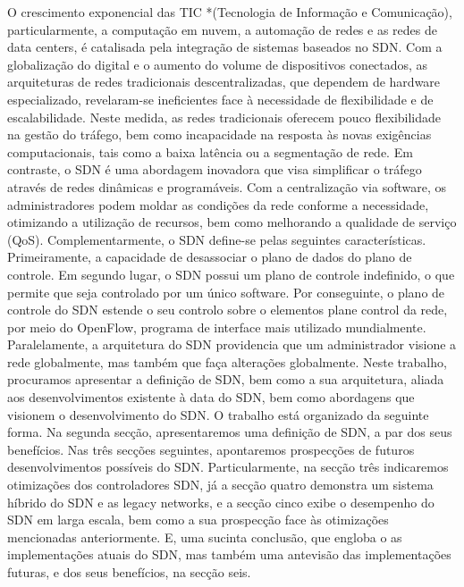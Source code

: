 \documentclass{llncs}
\begin{document}
O crescimento exponencial das TIC *(Tecnologia de Informação e Comunicação), particularmente, a computação em nuvem, a automação de redes e as redes de data centers, é catalisada pela integração de sistemas baseados no SDN. Com a globalização do digital e o aumento do volume de dispositivos conectados, as arquiteturas de redes tradicionais descentralizadas, que dependem de hardware especializado, revelaram-se ineficientes face à necessidade de flexibilidade e de escalabilidade. Neste medida, as redes tradicionais oferecem pouco flexibilidade na gestão do tráfego, bem como incapacidade na resposta às novas exigências computacionais, tais como a baixa latência ou a segmentação de rede. Em contraste, o SDN é uma abordagem inovadora que visa simplificar o tráfego através de redes dinâmicas e programáveis. Com a centralização via software, os administradores podem moldar as condições da rede conforme a necessidade, otimizando a utilização de recursos, bem como melhorando a qualidade de serviço (QoS).
\newline
Complementarmente, o SDN define-se pelas seguintes características. Primeiramente, a capacidade de desassociar o plano de dados do plano de controle.
 Em segundo lugar, o SDN possui um plano de controle indefinido, o que permite que seja controlado por um único software.
 Por conseguinte, o plano de controle do SDN    estende o seu controlo sobre o elementos plane control da rede, por meio do OpenFlow, programa de interface mais utilizado mundialmente. Paralelamente, a arquitetura do SDN providencia que um administrador visione a rede globalmente, mas também que faça alterações globalmente.
Neste trabalho, procuramos apresentar a definição de SDN, bem como a sua arquitetura, aliada aos desenvolvimentos existente à data do SDN, bem como abordagens que visionem o desenvolvimento do SDN. O trabalho está organizado da seguinte forma. Na segunda secção, apresentaremos uma definição de SDN, a par dos seus benefícios. Nas três secções seguintes, apontaremos prospecções de futuros desenvolvimentos possíveis do SDN. Particularmente, na secção três indicaremos otimizações dos controladores SDN, já a secção quatro demonstra um sistema híbrido do SDN e as legacy networks, e a secção cinco exibe o desempenho do SDN em larga escala, bem como a sua prospecção face às otimizações mencionadas anteriormente. E, uma sucinta conclusão, que engloba o as implementações atuais do SDN, mas também uma antevisão das implementações futuras, e dos seus benefícios, na secção seis.
\end{document}
